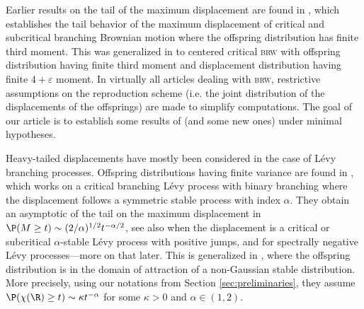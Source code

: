 \documentclass[10pt,a4paper]{article}
\newcommand{\brw}{\textsc{brw}\xspace}
\begin{document}
Earlier results on the tail of the maximum displacement are found in \cite{sawyer1979maximum}, which establishes the tail behavior of the maximum displacement of critical and subcritical branching Brownian motion where the offspring distribution has finite third moment. This was generalized in \cite{lalley2015maximal} to centered critical \brw with offspring distribution having finite third moment and displacement distribution having finite $4+\varepsilon$ moment. In virtually all articles dealing with \brw, restrictive assumptions on the reproduction scheme (i.e. the joint distribution of the displacements of the offsprings) are made to simplify computations. The goal of our article is to establish some results of \cite{lalley2015maximal} (and some new ones) under minimal hypotheses. 

Heavy-tailed displacements have mostly been considered in the case of Lévy branching processes. 
Offspring distributions having finite variance are found in 
\cite{lalley2016maximalstable}, which works on a critical branching Lévy process with binary branching where the displacement follows a symmetric stable process with index $\alpha$. They obtain an asymptotic of the tail on the maximum displacement in $\P(M \geq t) \sim (2/\alpha)^{1/2} t^{-\alpha/2}$, see also \cite{profeta2021extreme} when the displacement is a critical or subcritical $\alpha$-stable Lévy process with positive jumps, and \cite{profeta2024maximal} for spectrally negative Lévy processes---more on that later. 
This is generalized in \cite{hou2025tail}, where the offspring distribution is in the domain of attraction of a non-Gaussian stable distribution. More precisely, using our notations from Section \ref{sec:preliminaries}, they assume $\P(\chi(\R)\geq t)\sim \kappa t^{-\alpha}$ for some $\kappa>0$ and $\alpha\in (1,2)$. 
\end{document}
